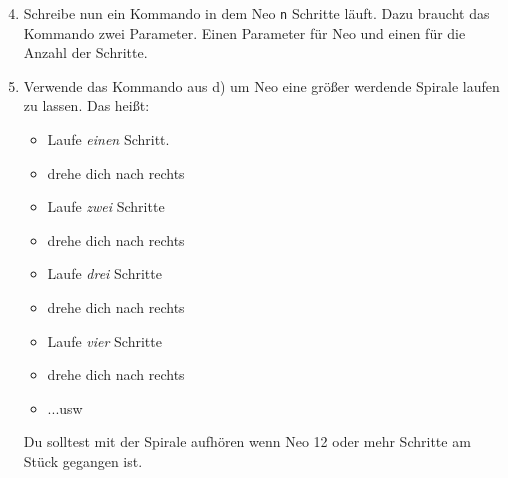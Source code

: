 \begin{enumerate}\setcounter{enumi}{3}
	\item
		Schreibe nun ein Kommando in dem Neo \lstinline{n} Schritte läuft.
		Dazu braucht das Kommando zwei Parameter.
		Einen Parameter für Neo und einen für die Anzahl der Schritte.

	\item
		Verwende das Kommando aus d) um Neo eine größer werdende Spirale laufen zu lassen. 
		Das heißt:
		
		\begin{itemize}
			\item[] Laufe \emph{einen} Schritt.
			\item[] drehe dich nach rechts
			\item[] Laufe \emph{zwei} Schritte
			\item[] drehe dich nach rechts
			\item[] Laufe \emph{drei} Schritte
			\item[] drehe dich nach rechts
			\item[] Laufe \emph{vier} Schritte
			\item[] drehe dich nach rechts
			\item[] ...usw
		\end{itemize}

		Du solltest mit der Spirale aufhören wenn Neo 12 oder mehr Schritte am Stück gegangen ist.
\end{enumerate}

\newpage

